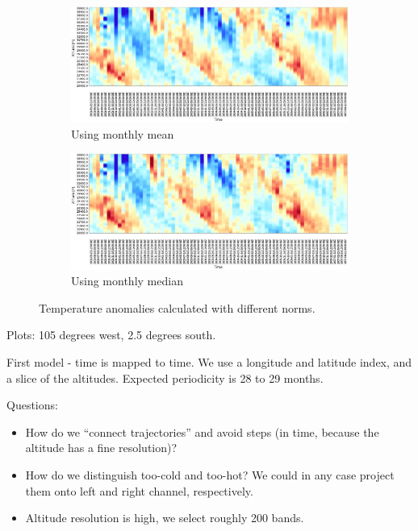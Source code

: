 \documentclass[11pt,a4paper]{article}
\begin{document}
\begin{figure}
\begin{subfigure}[b]{1.0\textwidth}%
\centering
\includegraphics[scale=0.45,trim=2mm 0 1mm 1mm]{figures/ta_anomalies_mean.jpg}
\caption{Using monthly mean}
\label{fig:anomaly-mean}
\end{subfigure}
\begin{subfigure}[b]{1.0\textwidth}%
\centering
\includegraphics[scale=0.45,trim=2mm 0 1mm -4mm]{figures/ta_anomalies_median.jpg}
\caption{Using monthly median}
\label{fig:anomaly-mean}
\end{subfigure}
\caption{Temperature anomalies calculated with different norms.}
\label{fig:anomaly-calc}
\end{figure}

Plots: 105 degrees west, 2.5 degrees south.

First model - time is mapped to time. We use a longitude and latitude index, and a slice of the altitudes. Expected periodicity is 28 to 29 months.

Questions:
%
\begin{itemize}
\item How do we ``connect trajectories'' and avoid steps (in time, because the altitude has a fine resolution)?
\item How do we distinguish too-cold and too-hot? We could in any case project them onto left and right channel, respectively.
\item Altitude resolution is high, we select roughly 200 bands.
\end{itemize}
%
\end{document}
